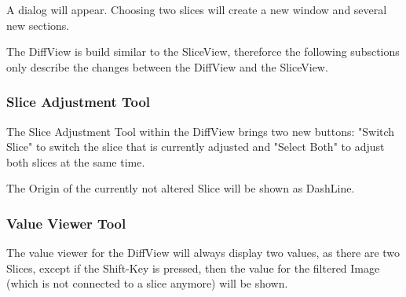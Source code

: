 A dialog will appear. Choosing two slices will create a new window and several new sections.

The DiffView is build similar to the SliceView, thereforce the following subsctions only describe the changes between the DiffView and the SliceView.


\subsubsection{Slice Adjustment Tool}

The Slice Adjustment Tool within the DiffView brings two new buttons: "Switch Slice" to switch the slice that is currently adjusted and "Select Both" to adjust both slices at the same time.

The Origin of the currently not altered Slice will be shown as DashLine. 

\subsubsection{Value Viewer Tool}
The value viewer for the DiffView will always display two values, as there are two Slices, except if the Shift-Key is pressed, then the value for the filtered Image (which is not connected to a slice anymore) will be shown.
